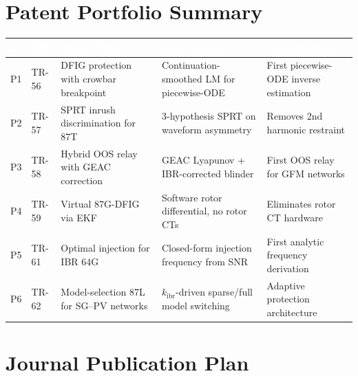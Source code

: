 \documentclass[12pt, a4paper]{report}
\begin{document}
\section{Patent Portfolio Summary}

\begin{center}
\renewcommand{\arraystretch}{1.35}
\begin{tabular}{C{0.5cm} C{0.8cm} L{4.0cm} L{4.8cm} L{3.0cm}}
\toprule
{}
\textcolor{white}{\textbf{\#}} &
\textcolor{white}{\textbf{TR}} &
\textcolor{white}{\textbf{Patent Title}} &
\textcolor{white}{\textbf{Core Claims}} &
\textcolor{white}{\textbf{Novelty Basis}} \\
\midrule
P1 & TR-56 & DFIG protection with crowbar breakpoint &
  Continuation-smoothed LM for piecewise-ODE &
  First piecewise-ODE inverse estimation \\
P2 & TR-57 & SPRT inrush discrimination for 87T &
  3-hypothesis SPRT on waveform asymmetry &
  Removes 2nd harmonic restraint \\
P3 & TR-58 & Hybrid OOS relay with GEAC correction &
  GEAC Lyapunov + IBR-corrected blinder &
  First OOS relay for GFM networks \\
P4 & TR-59 & Virtual 87G-DFIG via EKF &
  Software rotor differential, no rotor CTs &
  Eliminates rotor CT hardware \\
P5 & TR-61 & Optimal injection for IBR 64G &
  Closed-form injection frequency from SNR &
  First analytic frequency derivation \\
P6 & TR-62 & Model-selection 87L for SG--PV networks &
  $k_\mathrm{ibr}$-driven sparse/full model switching &
  Adaptive protection architecture \\
\bottomrule
\end{tabular}
\end{center}

\section{Journal Publication Plan}
\end{document}
